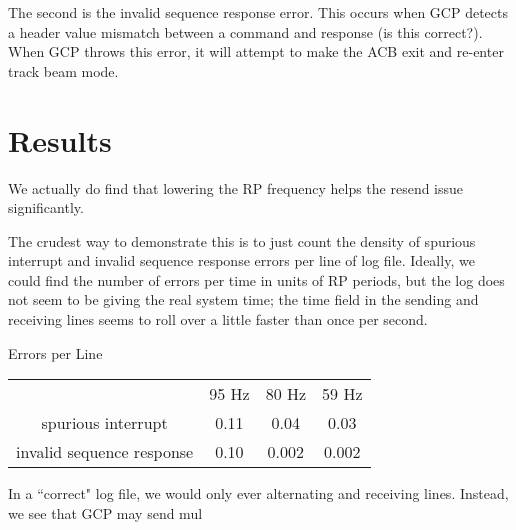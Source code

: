 \documentclass[12pt]{article}
\begin{document}
The second is the invalid sequence response error. This occurs when GCP detects a header value mismatch between a command and response (is this correct?). When GCP throws this error, it will attempt to make the ACB exit and re-enter track beam mode. 

\section{Results}

We actually do find that lowering the RP frequency helps the resend issue significantly.

The crudest way to demonstrate this is to just count the density of spurious interrupt and invalid sequence response errors per line of log file. Ideally, we could find the number of errors per time in units of RP periods, but the log does not seem to be giving the real system time; the time field in the sending and receiving lines seems to roll over a little faster than once per second.

\begin{center}

Errors per Line \linebreak

\begin{tabular}{cccc}
  & 95 Hz & 80 Hz & 59 Hz \\ 
spurious interrupt & 0.11 & 0.04 & 0.03 \\ 
invalid sequence response & 0.10 & 0.002 & 0.002 \\ 
\end{tabular} 
\end{center}

In a ``correct" log file, we would only ever alternating and receiving lines. Instead, we see that GCP may send mul
\end{document}
